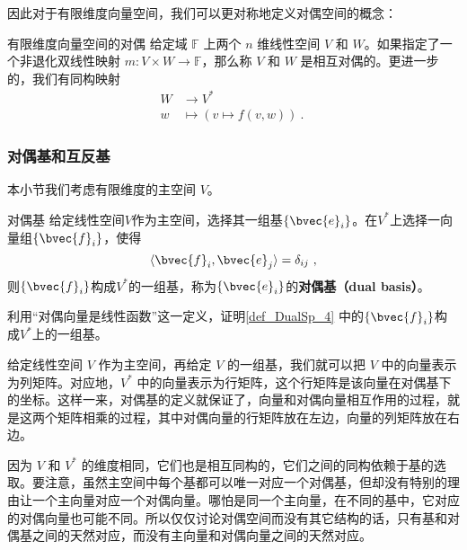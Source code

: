 
因此对于有限维度向量空间，我们可以更对称地定义对偶空间的概念：

\begin{definition}{有限维度向量空间的对偶}
给定域 $\mathbb{F}$ 上两个 $n$ 维线性空间 $V$ 和 $W$。如果指定了一个非退化双线性映射 $m:V\times W\rightarrow\mathbb{F}$，那么称 $V$ 和 $W$ 是相互对偶的。更进一步的，我们有同构映射
\begin{equation}
\begin{aligned}
W &\to V^* \\
w &\mapsto (v \mapsto f(v, w))~.
\end{aligned}~
\end{equation}

\end{definition}


\subsubsection{对偶基和互反基}

本小节我们考虑有限维度的主空间 $V$。

\begin{definition}{对偶基}\label{def_DualSp_4}
给定线性空间$V$作为主空间，选择其一组基$\{\bvec{e}_i\}$。在$V^*$上选择一向量组$\{\bvec{f}_i\}$，使得
\begin{equation}
\langle \bvec{f}_i, \bvec{e}_j \rangle = \delta_{ij}~, 
\end{equation}
则$\{\bvec{f}_i\}$构成$V^*$的一组基，称为$\{\bvec{e}_i\}$的\textbf{对偶基（dual basis）}。
\end{definition}

\begin{exercise}{}
利用“对偶向量是线性函数”这一定义，证明\autoref{def_DualSp_4} 中的$\{\bvec{f}_i\}$构成$V^*$上的一组基。
\end{exercise}

给定线性空间 $V$ 作为主空间，再给定 $V$ 的一组基，我们就可以把 $V$ 中的向量表示为列矩阵。对应地，$V^*$ 中的向量表示为行矩阵，这个行矩阵是该向量在对偶基下的坐标。这样一来，对偶基的定义就保证了，向量和对偶向量相互作用的过程，就是这两个矩阵相乘的过程，其中对偶向量的行矩阵放在左边，向量的列矩阵放在右边。

因为 $V$ 和 $V^*$ 的维度相同，它们也是相互同构的，它们之间的同构依赖于基的选取。要注意，虽然主空间中每个基都可以唯一对应一个对偶基，但却没有特别的理由让一个主向量对应一个对偶向量。哪怕是同一个主向量，在不同的基中，它对应的对偶向量也可能不同。所以仅仅讨论对偶空间而没有其它结构的话，只有基和对偶基之间的天然对应，而没有主向量和对偶向量之间的天然对应。

